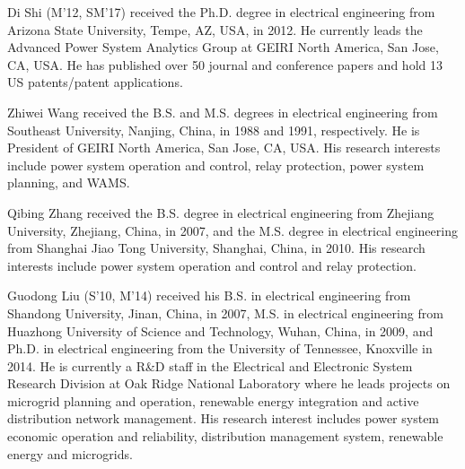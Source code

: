 \documentclass[journal]{IEEEtran}
\begin{document}
\begin{IEEEbiographynophoto}{Di Shi}
	(M’12, SM’17) received the Ph.D. degree in
	electrical engineering from Arizona State University,
	Tempe, AZ, USA, in 2012. He currently leads the
	Advanced Power System Analytics Group at GEIRI
	North America, San Jose, CA, USA. He has
	published over 50 journal and conference papers and
	hold 13 US patents/patent applications.
\end{IEEEbiographynophoto}

\begin{IEEEbiographynophoto}{Zhiwei Wang}
	received the B.S. and M.S. degrees in
	electrical engineering from Southeast University,
	Nanjing, China, in 1988 and 1991, respectively. He is
	President of GEIRI North America, San Jose, CA,
	USA. His research interests include power system
	operation and control, relay protection, power system
	planning, and WAMS.
\end{IEEEbiographynophoto}

\begin{IEEEbiographynophoto}{Qibing Zhang}
	received the B.S. degree in electrical
	engineering from Zhejiang University, Zhejiang, China,
	in 2007, and the M.S. degree in electrical engineering
	from Shanghai Jiao Tong University, Shanghai, China,
	in 2010. His research interests include power system
	operation and control and relay protection.
\end{IEEEbiographynophoto}

\begin{IEEEbiographynophoto}{Guodong Liu}
	(S’10, M’14) received his B.S. in electrical engineering from Shandong University, Jinan, China, in 2007, M.S. in electrical engineering from Huazhong University of Science and Technology, Wuhan, China, in 2009, and Ph.D. in electrical engineering from the University of Tennessee, Knoxville in 2014. He is currently a R\&D staff in the Electrical and Electronic System Research Division at Oak Ridge National Laboratory where he leads projects on microgrid planning and operation, renewable energy integration and active distribution network management. His research interest includes power system economic operation and reliability, distribution management system, renewable energy and microgrids.
\end{IEEEbiographynophoto}
\end{document}

